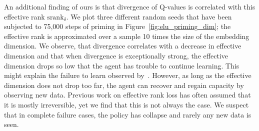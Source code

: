 An additional finding of ours is that divergence of Q-values is correlated with this effective rank $\text{srank}_{\delta}$. We plot three different random seeds that have been subjected to 75,000 steps of priming in Figure~\ref{fig:elu_priming_dim}; the effective rank is approximated over a sample 10 times the size of the embedding dimension. We observe, that divergence correlates with a decrease in effective dimension and that when divergence is exceptionally strong, the effective dimension drops so low that the agent has trouble to continue learning. This might explain the failure to learn observed by~\textcite{nikishin2022primacy}. However, as long as the effective dimension does not drop too far, the agent can recover and regain capacity by observing new data. 
Previous work on effective rank loss has often assumed that it is mostly irreversible, yet we find that this is not always the case.
We suspect that in complete failure cases, the policy has collapse and rarely any new data is seen.

